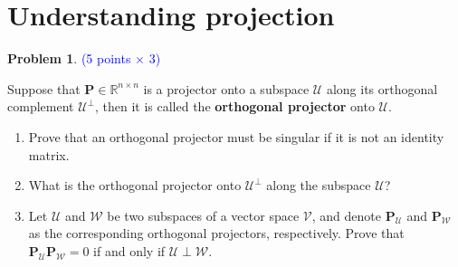 \documentclass[english,onecolumn]{IEEEtran}
\newcommand{\Rbb}{\mathbb{R}}
\newcommand{\Pb}{\mathbf{P}}
\newcommand{\Ucal}{\mathcal{U}}
\newcommand{\Wcal}{\mathcal{W}}
\begin{document}
\section{Understanding projection}
\noindent\textbf{Problem 1}. \textcolor{blue}{(5 points $\times$ 3)}

Suppose that $\Pb\in \Rbb^{n\times n}$ is a projector onto a subspace $\mathcal{U}$ along its orthogonal complement $\mathcal{U}^{\perp}$, then it is called the \textbf{orthogonal projector} onto $\Ucal$.
\begin{enumerate}
    \item Prove that an orthogonal projector must be singular if it is not an identity matrix.
	\item What is the orthogonal projector onto $\mathcal{U}^{\perp}$ along the subspace $\mathcal{U}$?
    \item Let $\Ucal$ and $\Wcal$ be two subspaces of a vector space $\mathcal{V}$, and denote $\Pb_{\Ucal}$ and $\Pb_{\Wcal}$ as the corresponding orthogonal projectors, respectively. Prove that $\Pb_{\Ucal} \Pb_{\Wcal} = 0$ if and only if $\Ucal \perp \Wcal$.
\end{enumerate}
\end{document}
